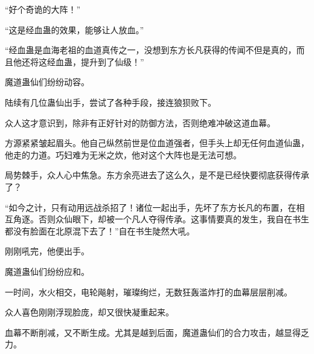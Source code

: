 \begin{this_body}
“好个奇诡的大阵！”

“这是经血蛊的效果，能够让人放血。”

“经血蛊是血海老祖的血道真传之一，没想到东方长凡获得的传闻不但是真的，而且他还将这经血蛊，提升到了仙级！”

魔道蛊仙们纷纷动容。

陆续有几位蛊仙出手，尝试了各种手段，接连狼狈败下。

众人这才意识到，除非有正好针对的防御方法，否则绝难冲破这道血幕。

方源紧紧皱起眉头。他自己纵然前世是位血道强者，但手头上却无任何血道仙蛊，他走的力道。巧妇难为无米之炊，他对这个大阵也是无法可想。

局势棘手，众人心中焦急。东方余亮进去了这么久，是不是已经快要彻底获得传承了？

“如今之计，只有动用远战杀招了！诸位一起出手，先坏了东方长凡的布置，在相互角逐。否则众仙眼下，却被一个凡人夺得传承。这事情要真的发生，我自在书生都没有脸面在北原混下去了！”自在书生陡然大吼。

刚刚吼完，他便出手。

魔道蛊仙们纷纷应和。

一时间，水火相交，电轮飚射，璀璨绚烂，无数狂轰滥炸打的血幕层层削减。

众人喜色刚刚浮现脸庞，却又很快凝重起来。

血幕不断削减，又不断生成。尤其是越到后面，魔道蛊仙们的合力攻击，越显得乏力。

\end{this_body}

